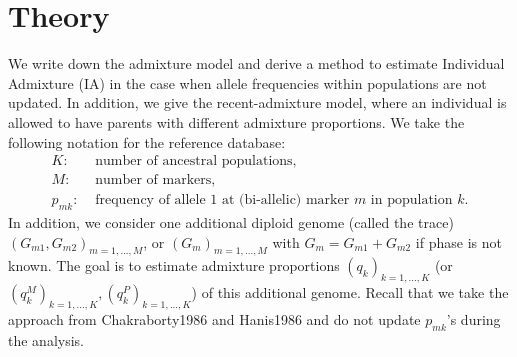 \documentclass[12pt]{article}
\theoremstyle{definition}
\begin{document}
\renewcommand{\theequation}{S\arabic{equation}}
\renewcommand{\thefigure}{S\arabic{figure}}
\renewcommand{\thetable}{S\arabic{table}}
\renewcommand{\thesection}{S\arabic{section}}


\section{Theory}
We write down the admixture model and derive a method to estimate
Individual Admixture (IA) in the case when allele frequencies within
populations are not updated. In addition, we give the recent-admixture
model, where an individual is allowed to have parents with different
admixture proportions. We take the following notation for the
reference database:
\begin{align*}
  K: & \text{ number of ancestral populations,}
  \\ M: & \text{ number of markers,}
  \\ p_{mk}: & \text{ frequency of allele 1 at (bi-allelic) marker $m$ in population $k$.}
\end{align*}
In addition, we consider one additional diploid genome (called the
trace) $(G_{m1}, G_{m2})_{m=1,...,M}$, or $(G_m)_{m=1,...,M}$ with
$G_m = G_{m1} + G_{m2}$ if phase is not known. The goal is to estimate
admixture proportions $(q_k)_{k=1,...,K}$ (or
$(q^M_{k})_{k=1,...,K}, (q^P_{k})_{k=1,...,K}$) of this additional
genome.  Recall that we take the approach from
\cite{SI}{Chakraborty1986} and \cite{SI}{Hanis1986} and do
not update $p_{mk}$'s during the analysis.
\end{document}
